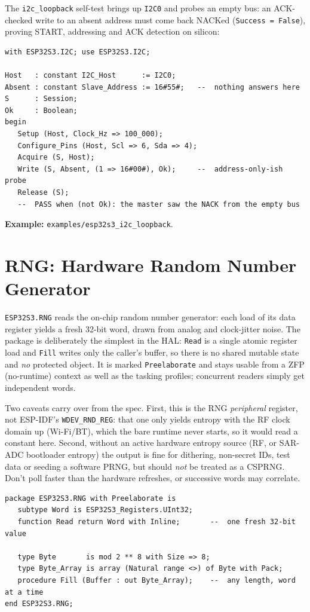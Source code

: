The \texttt{i2c\_loopback} self-test brings up \texttt{I2C0} and probes an empty
bus: an ACK-checked write to an absent address must come back NACKed
(\texttt{Success = False}), proving START, addressing and ACK detection on
silicon:

\begin{lstlisting}
with ESP32S3.I2C; use ESP32S3.I2C;

Host   : constant I2C_Host      := I2C0;
Absent : constant Slave_Address := 16#55#;   --  nothing answers here
S      : Session;
Ok     : Boolean;
begin
   Setup (Host, Clock_Hz => 100_000);
   Configure_Pins (Host, Scl => 6, Sda => 4);
   Acquire (S, Host);
   Write (S, Absent, (1 => 16#00#), Ok);     --  address-only-ish probe
   Release (S);
   --  PASS when (not Ok): the master saw the NACK from the empty bus
\end{lstlisting}

\noindent\textbf{Example:} \texttt{examples/esp32s3\_i2c\_loopback}.

\section{RNG: Hardware Random Number Generator}
\label{app:int:rng}

\texttt{ESP32S3.RNG} reads the on-chip random number generator: each load of its
data register yields a fresh 32-bit word, drawn from analog and clock-jitter
noise. The package is deliberately the simplest in the HAL: \texttt{Read} is a
single atomic register load and \texttt{Fill} writes only the caller's buffer,
so there is no shared mutable state and \emph{no} protected object. It is marked
\texttt{Preelaborate} and stays usable from a ZFP (no-runtime) context as well
as the tasking profiles; concurrent readers simply get independent words.

Two caveats carry over from the spec. First, this is the RNG \emph{peripheral}
register, not ESP-IDF's \texttt{WDEV\_RND\_REG}: that one only yields entropy
with the RF clock domain up (Wi-Fi/BT), which the bare runtime never starts, so
it would read a constant here. Second, without an active hardware entropy source
(RF, or SAR-ADC bootloader entropy) the output is fine for dithering, non-secret
IDs, test data or seeding a software PRNG, but should \emph{not} be treated as a
CSPRNG. Don't poll faster than the hardware refreshes, or successive words may
correlate.

\begin{lstlisting}
package ESP32S3.RNG with Preelaborate is
   subtype Word is ESP32S3_Registers.UInt32;
   function Read return Word with Inline;       --  one fresh 32-bit value

   type Byte       is mod 2 ** 8 with Size => 8;
   type Byte_Array is array (Natural range <>) of Byte with Pack;
   procedure Fill (Buffer : out Byte_Array);    --  any length, word at a time
end ESP32S3.RNG;
\end{lstlisting}

